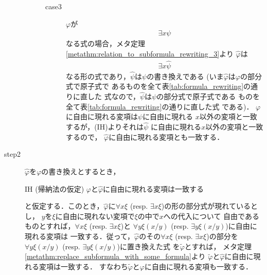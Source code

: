 \begin{metaprf}
\begin{description}
\begin{description}
\begin{description}
							\item[case3] $\varphi$が
								\begin{align}
									\exists x \psi
								\end{align}
								なる式の場合，メタ定理
								\ref{metathm:relation_to_subformula_rewriting_3}より
								$\widehat{\varphi}$は
								\begin{align}
									\exists x \widehat{\psi}
								\end{align}
								なる形の式であり，$\widehat{\psi}$は$\psi$の書き換えである
								(いま$\widehat{\varphi}$は$\varphi$の部分式で原子式で
								あるものを全て表\ref{tab:formula_rewriting}の通りに直した
								式なので，$\widehat{\psi}$は$\psi$の部分式で原子式である
								ものを全て表\ref{tab:formula_rewriting}の通りに直した式
								である)．
								$\varphi$に自由に現れる変項は$\psi$に自由に現れる
								$x$以外の変項と一致するが，(IH)よりそれは$\widehat{\psi}$
								に自由に現れる$x$以外の変項と一致するので，
								$\widehat{\varphi}$に自由に現れる変項とも一致する．
								\QED
						\end{description}
				\end{description}
			
			\item[step2]
				$\widehat{\varphi}$を$\varphi$の書き換えとするとき，
				\begin{itembox}[l]{IH (帰納法の仮定)}
					$\varphi$と$\widehat{\varphi}$に自由に現れる変項は一致する
				\end{itembox}
				と仮定する．このとき，$\widehat{\varphi}$に$\forall x \xi$ 
				(resp. $\exists x \xi$)の形の部分式が現れているとし，
				$y$を$\xi$に自由に現れない変項で$\xi$の中で$x$への代入について
				自由であるものとすれば，$\forall x \xi$ (resp. $\exists x \xi$)と
				$\forall y \xi(x/y)$ (resp. $\exists y \xi(x/y)$)に自由に現れる変項は
				一致する．従って，$\widehat{\varphi}$のその$\forall x \xi$ 
				(resp. $\exists x \xi$)の部分を
				$\forall y \xi(x/y)$ (resp. $\exists y \xi(x/y)$)に置き換えた式
				を$\widetilde{\varphi}$とすれば，
				メタ定理\ref{metathm:replace_subformula_with_some_formula}より
				$\widetilde{\varphi}$と$\widehat{\varphi}$に自由に現れる変項は一致する．
				すなわち$\widetilde{\varphi}$と$\varphi$に自由に現れる変項も一致する．
				\QED
		\end{description}
	\end{metaprf}